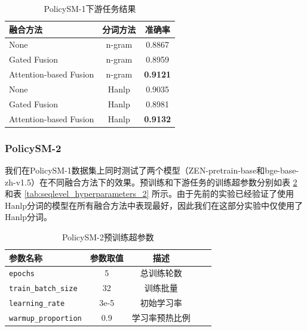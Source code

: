 \documentclass[12pt, a4paper]{ctexart}
\begin{document}
\begin{table}[ht]
    \renewcommand{\arraystretch}{1}
    \centering
    \caption{PolicySM-1下游任务结果}
    \begin{tabular}{lcc}
    \toprule
    \textbf{融合方法} & \textbf{分词方法} & \textbf{准确率} \\
    \midrule
    None                   & n-gram                   & 0.8867 \\
    Gated Fusion           & n-gram                  & 0.8959 \\
    Attention-based Fusion   & n-gram                 & \textbf{0.9121}\\
    \midrule
    None                   & Hanlp                       & 0.9035 \\
    Gated Fusion           & Hanlp                       & 0.8981 \\
    Attention-based Fusion   & Hanlp                     & \textbf{0.9132} \\
    \bottomrule
    \end{tabular}
    \label{tab:fusion_results_1}
\end{table}

\newpage

\subsubsection{PolicySM-2}
我们在PolicySM-1数据集上同时测试了两个模型（ZEN-pretrain-base和bge-base-zh-v1.5）在不同融合方法下的效果。预训练和下游任务的训练超参数分别如表 \ref{tab:pretrain_hyperparameters_2} 和表 \ref{tab:seqlevel_hyperparameters_2} 所示。由于先前的实验已经验证了使用Hanlp分词的模型在所有融合方法中表现最好，因此我们在这部分实验中仅使用了Hanlp分词。

\begin{table}[H]
    \renewcommand{\arraystretch}{1}
    \centering
    \caption{PolicySM-2预训练超参数}
    \begin{tabular}{lcccc}
        \toprule
        \textbf{参数名称} & \textbf{参数取值} & \textbf{描述} \\
        \midrule
        \texttt{epochs} & 5 & 总训练轮数 \\ 
        \texttt{train\_batch\_size} & 32 & 训练批量 \\
        \texttt{learning\_rate} & 3e-5 & 初始学习率 \\ 
        \texttt{warmup\_proportion} & 0.9 & 学习率预热比例 \\ 
        \bottomrule
    \end{tabular}
    \label{tab:pretrain_hyperparameters_2}
\end{table}
\end{document}
